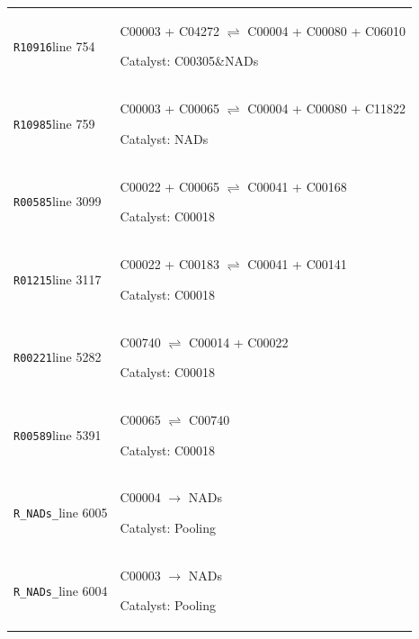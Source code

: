 \documentclass[10pt]{article}
\begin{document}
\begin{longtable}{>{\raggedright\arraybackslash}p{.17\linewidth}>{\raggedright\arraybackslash}p{.75\linewidth}}
\texttt{R10916}\newline line 754 & C00003 + C04272 $\rightleftharpoons$ C00004 + C00080 + C06010\par\smallskip Catalyst: C00305\&\allowbreak NADs\\
\texttt{R10985}\newline line 759 & C00003 + C00065 $\rightleftharpoons$ C00004 + C00080 + C11822\par\smallskip Catalyst: NADs\\
\texttt{R00585}\newline line 3099 & C00022 + C00065 $\rightleftharpoons$ C00041 + C00168\par\smallskip Catalyst: C00018\\
\texttt{R01215}\newline line 3117 & C00022 + C00183 $\rightleftharpoons$ C00041 + C00141\par\smallskip Catalyst: C00018\\
\texttt{R00221}\newline line 5282 & C00740 $\rightleftharpoons$ C00014 + C00022\par\smallskip Catalyst: C00018\\
\texttt{R00589}\newline line 5391 & C00065 $\rightleftharpoons$ C00740\par\smallskip Catalyst: C00018\\
\texttt{R\_\allowbreak NADs\_\allowbreak 2}\newline line 6005 & C00004 $\longrightarrow$ NADs\par\smallskip Catalyst: Pooling\\
\texttt{R\_\allowbreak NADs\_\allowbreak 1}\newline line 6004 & C00003 $\longrightarrow$ NADs\par\smallskip Catalyst: Pooling\\
\bottomrule\end{longtable}
\end{document}

